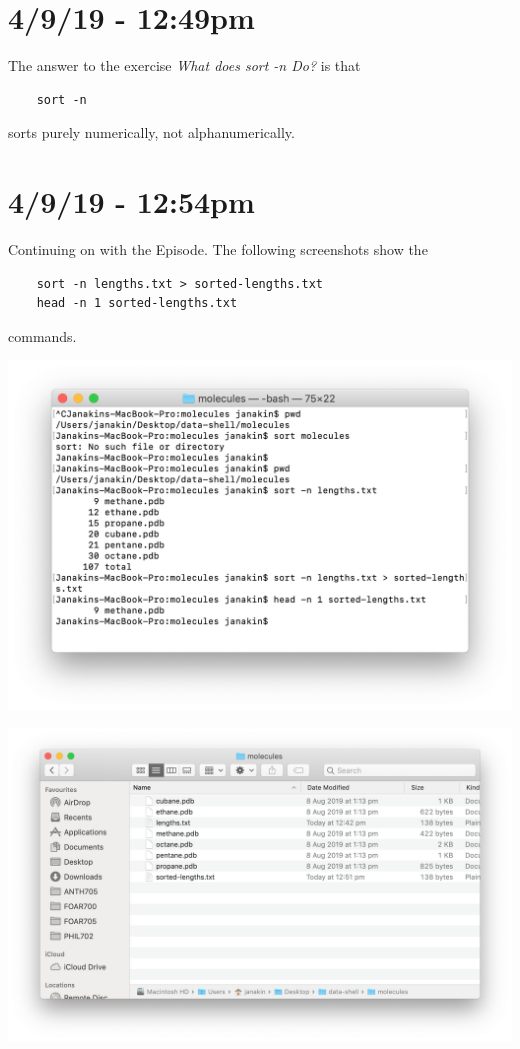 \documentclass{article}
\begin{document}
\section*{4/9/19 - 12:49pm}

The answer to the exercise \textit{What does sort -n Do?} is that \begin{verbatim}
    sort -n
\end{verbatim}
sorts purely numerically, not alphanumerically.

\section*{4/9/19 - 12:54pm}

Continuing on with the Episode. The following screenshots show the \begin{verbatim}
    sort -n lengths.txt > sorted-lengths.txt
    head -n 1 sorted-lengths.txt
\end{verbatim}
commands.

\includegraphics[width=\textwidth]{fige.png}

\includegraphics[width=\textwidth]{figf.png}
\end{document}
